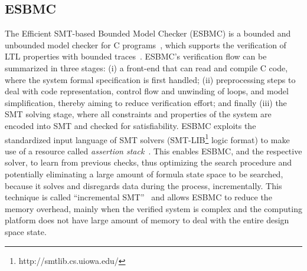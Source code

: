 \documentclass[review]{elsarticle}
\begin{document}
\subsection{ESBMC}
The Efficient SMT-based Bounded Model Checker (ESBMC) is a bounded and unbounded model checker for C programs~\citep{esbmc2018}, which supports the verification of LTL properties with bounded traces~\citep{DBLP:journals/sosym/MorseCN015}. ESBMC's verification flow can be summarized in three stages: (i) a front-end that can read and compile C code, where the system formal specification is first handled; (ii) preprocessing steps to deal with code representation, control flow and unwinding of loops, and model simplification, thereby aiming to reduce verification effort; and finally (iii) the SMT solving stage, where all constraints and properties of the system are encoded into SMT and checked for satisfiability. ESBMC exploits the standardized input language of SMT solvers (SMT-LIB\footnote{http://smtlib.cs.uiowa.edu/} logic format) to make use of a resource called \textit{assertion stack}~\citep{Morse2015}. This enables ESBMC, and the respective solver, to learn from previous checks, thus optimizing the search procedure and potentially eliminating a large amount of formula state space to be searched, because it solves and disregards data during the process, incrementally. This technique is called ``incremental SMT''~\citep{DBLP:journals/fac/SchrammelKBMTB17} and allows ESBMC to reduce the memory overhead, mainly when the verified system is complex and the computing platform does not have large amount of memory to deal with the entire design space state.
%
\end{document}
